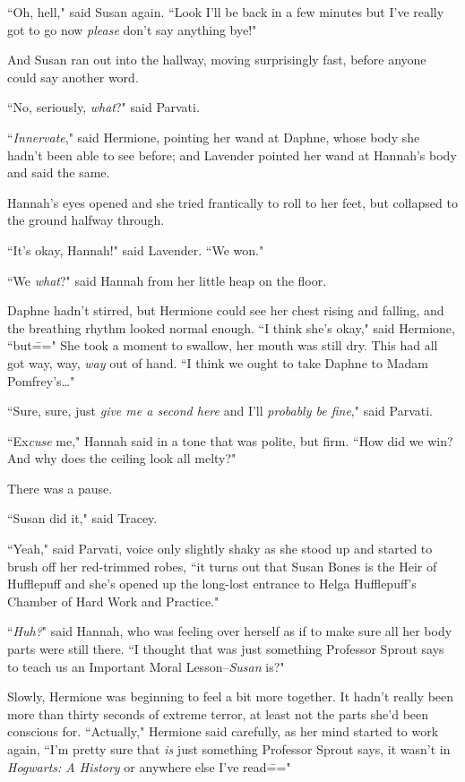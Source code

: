 ``Oh, hell," said Susan again. ``Look I'll be back in a few minutes but I've really got to go now \emph{please} don't say anything bye!"

And Susan ran out into the hallway, moving surprisingly fast, before anyone could say another word.

``No, seriously, \emph{what}?" said Parvati.

``\emph{Innervate}," said Hermione, pointing her wand at Daphne, whose body she hadn't been able to see before; and Lavender pointed her wand at Hannah's body and said the same.

Hannah's eyes opened and she tried frantically to roll to her feet, but collapsed to the ground halfway through.

``It's okay, Hannah!" said Lavender. ``We won."

``We \emph{what}?" said Hannah from her little heap on the floor.

Daphne hadn't stirred, but Hermione could see her chest rising and falling, and the breathing rhythm looked normal enough. ``I think she's okay," said Hermione, ``but\===" She took a moment to swallow, her mouth was still dry. This had all got way, way, \emph{way} out of hand. ``I think we ought to take Daphne to Madam Pomfrey's{\ldots}"

``Sure, sure, just \emph{give me a second here} and I'll \emph{probably be fine}," said Parvati.

``Ex\emph{cuse} me," Hannah said in a tone that was polite, but firm. ``How did we win? And why does the ceiling look all melty?"

There was a pause.

``Susan did it," said Tracey.

``Yeah," said Parvati, voice only slightly shaky as she stood up and started to brush off her red-trimmed robes, ``it turns out that Susan Bones is the Heir of Hufflepuff and she's opened up the long-lost entrance to Helga Hufflepuff's Chamber of Hard Work and Practice."

``\emph{Huh?}" said Hannah, who was feeling over herself as if to make sure all her body parts were still there. ``I thought that was just something Professor Sprout says to teach us an Important Moral Lesson\---\emph{Susan} is?"

Slowly, Hermione was beginning to feel a bit more together. It hadn't really been more than thirty seconds of extreme terror, at least not the parts she'd been conscious for. ``Actually," Hermione said carefully, as her mind started to work again, ``I'm pretty sure that \emph{is} just something Professor Sprout says, it wasn't in \emph{Hogwarts: A History} or anywhere else I've read\==="

